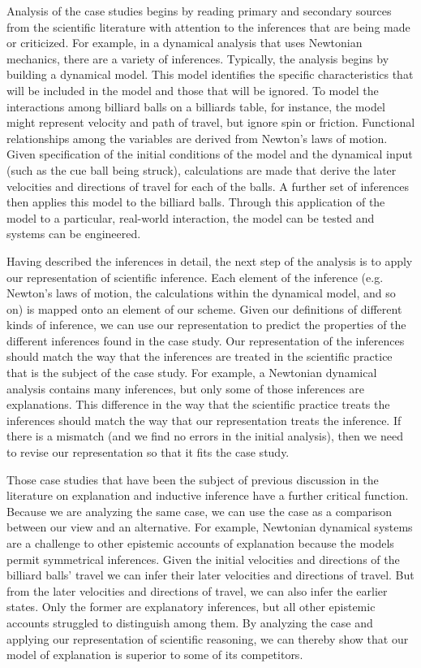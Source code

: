 \documentclass{article}[11pt]
\begin{document}
Analysis of the case studies begins by reading primary and secondary sources from the scientific literature with attention to the inferences that are being made or criticized.  For example, in a dynamical analysis that uses Newtonian mechanics, there are a variety of inferences.  Typically, the analysis begins by building a dynamical model.  This model identifies the specific characteristics that will be included in the model and those that will be ignored.  To model the interactions among billiard balls on a billiards table, for instance, the model might represent velocity and path of travel, but ignore spin or friction.  Functional relationships among the variables are derived from Newton's laws of motion.  Given specification of the initial conditions of the model and the dynamical input (such as the cue ball being struck), calculations are made that derive the later velocities and directions of travel for each of the balls.  A further set of inferences then applies this model to the billiard balls.  Through this application of the model to a particular, real-world interaction, the model can be tested and systems can be engineered.  

Having described the inferences in detail, the next step of the analysis is to apply our representation of scientific inference.  Each element of the inference (e.g. Newton's laws of motion, the calculations within the dynamical model, and so on) is mapped onto an element of our scheme.  Given our definitions of different kinds of inference, we can use our representation to predict the properties of the different inferences found in the case study.  Our representation of the inferences should match the way that the inferences are treated in the scientific practice that is the subject of the case study.  For example, a Newtonian dynamical analysis contains many inferences, but only some of those inferences are explanations.  This difference in the way that the scientific practice treats the inferences should match the way that our representation treats the inference.  If there is a mismatch (and we find no errors in the initial analysis), then we need to revise our representation so that it fits the case study.  

Those case studies that have been the subject of previous discussion in the literature on explanation and inductive inference have a further critical function.   Because we are analyzing the same case, we can use the case as a comparison between our view and an alternative.  For example, Newtonian dynamical systems are a challenge to other epistemic accounts of explanation because the models permit symmetrical inferences.  Given the initial   velocities and directions of the billiard balls' travel we can infer their later velocities and directions of travel.  But from the later velocities and directions of travel, we can also infer the earlier states.  Only the former are explanatory inferences, but all other epistemic accounts struggled to distinguish among them.  By analyzing the case and applying our representation of scientific reasoning, we can thereby show that our model of explanation is superior to some of its competitors.
\end{document}
